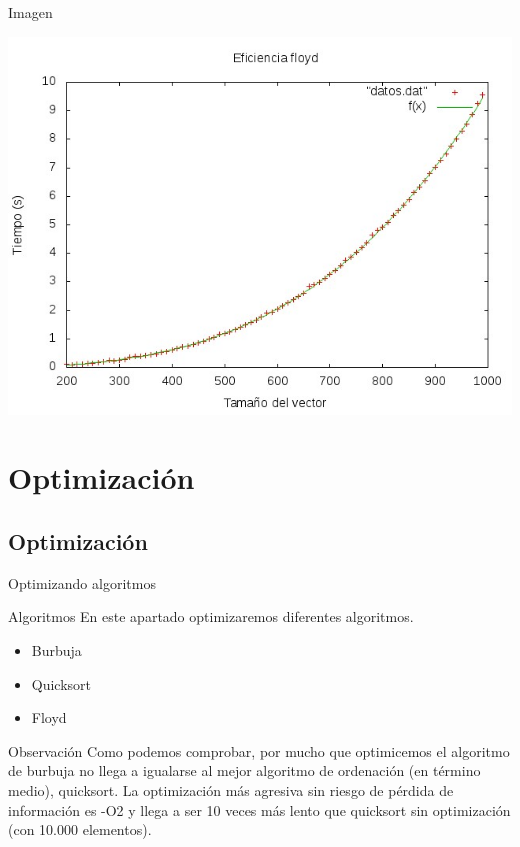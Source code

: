 \documentclass[compress]{beamer}
\begin{document}
\begin{frame}
	\begin{alertblock}{Imagen}
	\begin{center}
	\includegraphics[scale=0.50]{../Graficas/Floyd/floydO0_ruben.jpeg}	
	\end{center}
	\end{alertblock}
\end{frame}




\section{Optimización}
\subsection{Optimización}
\begin{frame}{Optimizando algoritmos}
	\begin{block}{Algoritmos}
	En este apartado optimizaremos diferentes algoritmos.
	\begin{itemize}
	\item Burbuja
	\item Quicksort
	\item Floyd
	\end{itemize}
	\end{block}
	
	\pause
	\begin{block}{Observación}
	Como podemos comprobar, por mucho que optimicemos el algoritmo de burbuja no llega a igualarse al mejor algoritmo de ordenación (en término medio), quicksort. La optimización más agresiva sin riesgo de pérdida de información es -O2 y llega a ser 10 veces más lento que quicksort sin optimización (con 10.000 elementos).
	\end{block}
\end{frame}
\end{document}
